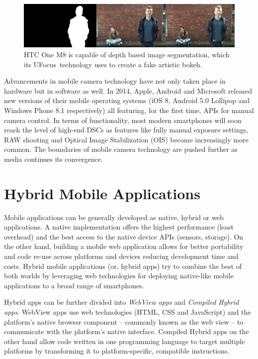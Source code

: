 \documentclass[thesis.tex]{subfiles}
\begin{document}
\begin{figure}[h]
\centering \includegraphics[width=\textwidth]{images/htc-ufocus.jpg}
\caption{HTC One M8 is capable of depth based image segmentation, which its UFocus\texttrademark\ technology uses to create a fake artistic bokeh.\label{figure:htc-ufocus} \cite{htc_one_ufocus}}
\end{figure}

Advancements in mobile camera technology have not only taken place in hardware but in software as well. In 2014, Apple, Android and Microsoft released new versions of their mobile operating systems (iOS 8, Android 5.0 Lollipop and Windows Phone 8.1 respectively) all featuring, for the first time, APIs for manual camera control. In terms of functionality, most modern smartphones will soon reach the level of high-end DSCs as features like fully manual exposure settings, RAW shooting and Optical Image Stabilization (OIS) become increasingly more common. The boundaries of mobile camera technology are pushed further as media continues its convergence.

\section{Hybrid Mobile Applications}
\label{section:hybrid_mobile_landscape}

Mobile applications can be generally developed as native, hybrid or web applications. A native implementation offers the highest performance (least overhead) and the best access to the native device APIs (sensors, storage). On the other hand, building a mobile web application allows for better portability and code re-use across platforms and devices reducing development time and costs. Hybrid mobile applications (or, hybrid apps) try to combine the best of both worlds by leveraging web technologies for deploying native-like mobile applications to a broad range of smartphones.

Hybrid apps can be further divided into \textit{WebView apps} and \textit{Compiled Hybrid apps}. WebView apps use web technologies (HTML, CSS and JavaScript) and the platform's native browser component -- commonly known as the web view -- to communicate with the platform's native interface. Compiled Hybrid apps on the other hand allow code written in one programming language to target multiple platforms by transforming it to platform-specific, compatible instructions.
\end{document}
